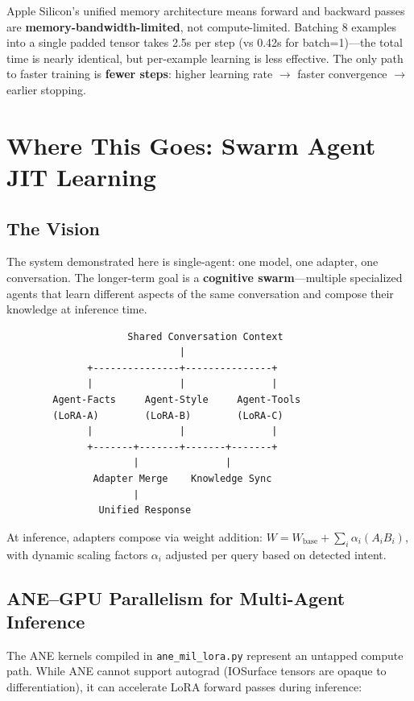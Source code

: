 \documentclass[11pt,a4paper]{article}
\begin{document}
Apple Silicon's unified memory architecture means forward and backward passes are \textbf{memory-bandwidth-limited}, not compute-limited. Batching 8 examples into a single padded tensor takes 2.5s per step (vs 0.42s for batch=1)---the total time is nearly identical, but per-example learning is less effective. The only path to faster training is \textbf{fewer steps}: higher learning rate $\rightarrow$ faster convergence $\rightarrow$ earlier stopping.

\section{Where This Goes: Swarm Agent JIT Learning}
\label{sec:future}

\subsection{The Vision}

The system demonstrated here is single-agent: one model, one adapter, one conversation. The longer-term goal is a \textbf{cognitive swarm}---multiple specialized agents that learn different aspects of the same conversation and compose their knowledge at inference time.

\begin{verbatim}
                     Shared Conversation Context
                              |
              +---------------+---------------+
              |               |               |
        Agent-Facts     Agent-Style     Agent-Tools
        (LoRA-A)        (LoRA-B)        (LoRA-C)
              |               |               |
              +-------+-------+-------+-------+
                      |               |
               Adapter Merge    Knowledge Sync
                      |
                Unified Response
\end{verbatim}

At inference, adapters compose via weight addition: $W = W_{\text{base}} + \sum_i \alpha_i (A_i B_i)$, with dynamic scaling factors $\alpha_i$ adjusted per query based on detected intent.

\subsection{ANE--GPU Parallelism for Multi-Agent Inference}

The ANE kernels compiled in \texttt{ane\_mil\_lora.py} represent an untapped compute path. While ANE cannot support autograd (IOSurface tensors are opaque to differentiation), it can accelerate LoRA forward passes during inference:
\end{document}
